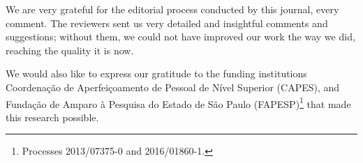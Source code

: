 
We are very grateful for the editorial process conducted by this journal, every comment. The reviewers sent us very detailed and insightful comments and suggestions; without them, we could not have improved our work the way we did, reaching the quality it is now. 

We would also like to express our gratitude to the funding institutions Coordenação de Aperfeiçoamento de Pessoal de Nível Superior (CAPES), and Fundação de Amparo à Pesquisa do Estado de São Paulo (FAPESP)\footnote{Processes 2013/07375-0 and 2016/01860-1.} that made this research possible.